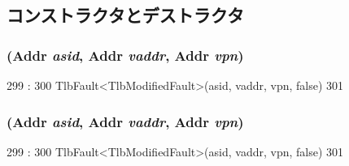 \subsection{コンストラクタとデストラクタ}
\hypertarget{classMipsISA_1_1TlbModifiedFault_ab261557a8ae48a09a85999d0ddccfead}{
\subsubsection[{TlbModifiedFault}]{ ({\bf Addr} {\em asid}, \/  {\bf Addr} {\em vaddr}, \/  {\bf Addr} {\em vpn})}}
\label{classMipsISA_1_1TlbModifiedFault_ab261557a8ae48a09a85999d0ddccfead}



\begin{DoxyCode}
299                                                       :
300         TlbFault<TlbModifiedFault>(asid, vaddr, vpn, false)
301     {}

\end{DoxyCode}
\hypertarget{classMipsISA_1_1TlbModifiedFault_ab261557a8ae48a09a85999d0ddccfead}{
\subsubsection[{TlbModifiedFault}]{ ({\bf Addr} {\em asid}, \/  {\bf Addr} {\em vaddr}, \/  {\bf Addr} {\em vpn})}}
\label{classMipsISA_1_1TlbModifiedFault_ab261557a8ae48a09a85999d0ddccfead}



\begin{DoxyCode}
299                                                       :
300         TlbFault<TlbModifiedFault>(asid, vaddr, vpn, false)
301     {}

\end{DoxyCode}


